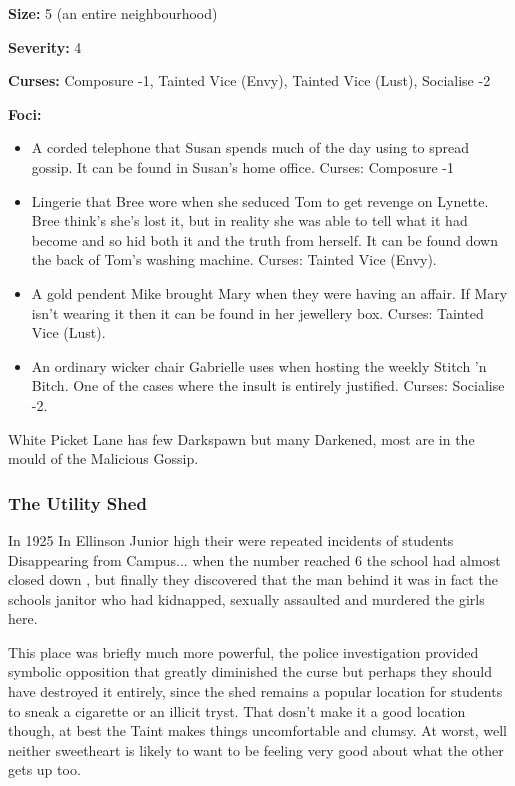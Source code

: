 \noindent \textbf{Size:} 5 (an entire neighbourhood) 

\noindent \textbf{Severity:} 4

\noindent \textbf{Curses:} Composure -1, Tainted Vice (Envy), Tainted Vice (Lust), Socialise -2

\noindent \textbf{Foci:}

    \begin{itemize}
\item A corded telephone that Susan spends much of the day using to spread gossip. It can be found in Susan's home office. Curses: Composure -1
    \item Lingerie that Bree wore when she seduced Tom to get revenge on Lynette. Bree think's she's lost it, but in reality she was able to tell what it had become and so hid both it and the truth from herself. It can be found down the back of Tom's washing machine. Curses: Tainted Vice (Envy).
    \item A gold pendent Mike brought Mary when they were having an affair. If Mary isn't wearing it then it can be found in her jewellery box. Curses: Tainted Vice (Lust).
    \item An ordinary wicker chair Gabrielle uses when hosting the weekly Stitch 'n Bitch. One of the cases where the insult is entirely justified. Curses: Socialise -2.    \end{itemize}


White Picket Lane has few Darkspawn but many Darkened, most are in the mould of the Malicious Gossip.

\subsubsection*{The Utility Shed}

In 1925 In Ellinson Junior high their were repeated incidents of students Disappearing from Campus... when the number reached 6 the school had almost closed down , but finally they discovered that the man behind it was in fact the schools janitor who had kidnapped, sexually assaulted and murdered the girls here.

This place was briefly much more powerful, the police investigation provided symbolic opposition that greatly diminished the curse but perhaps they should have destroyed it entirely, since the shed remains a popular location for students to sneak a cigarette or an illicit tryst. That dosn't make it a good location though, at best the Taint makes things uncomfortable and clumsy. At worst, well neither sweetheart is likely to want to be feeling very good about what the other gets up too.

